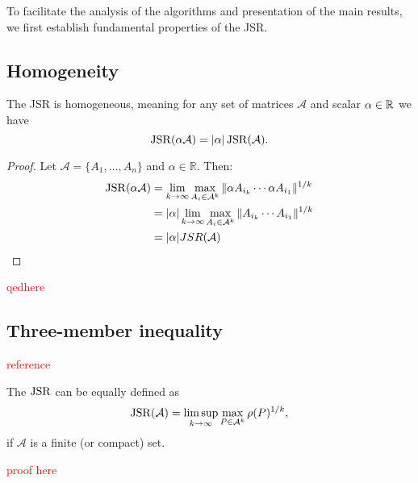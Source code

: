 To facilitate the analysis of the algorithms and presentation of the main results, we first establish fundamental properties of the JSR.

\subsection*{Homogeneity}
\begin{proposition}
    The JSR is homogeneous, meaning for any set of matrices $\mathcal{A}$ and scalar $\alpha \in \mathbb{R}$ we have
    \begin{equation}
        \operatorname{JSR}(\alpha \mathcal{A}) = |\alpha| \operatorname{JSR}(\mathcal{A}).
    \end{equation}
\end{proposition}
\begin{proof}
    Let $\mathcal{A} = \{A_1, \dots, A_n\}$ and $\alpha \in \mathbb{R}$. Then:
    \begin{align*}
        \operatorname{JSR}(\alpha \mathcal{A}) & = \lim_{k \to \infty} \max_{A_{i} \in \mathcal{A}^k} \|\alpha A_{i_k} \cdots \alpha A_{i_1}\|^{1/k} \\
        & = |\alpha| \lim_{k \to \infty} \max_{A_{i} \in \mathcal{A}^k} \|A_{i_k} \cdots A_{i_1}\|^{1/k} \\
        & = |\alpha| JSR(\mathcal{A}) \\
    \end{align*}
\end{proof}
\textcolor{red}{qedhere}

\subsection*{Three-member inequality}
\textcolor{red}{reference}
\begin{proposition}
    The $\operatorname{JSR}$ can be equally defined as
    $$
    \operatorname{JSR}(\mathcal{A}) = \limsup_{k \to \infty} \max_{P \in \mathcal{A}^k} \rho(P)^{1/k},
    $$
    if $\mathcal{A}$ is a finite (or compact) set.
\end{proposition}

\textcolor{red}{proof here}

